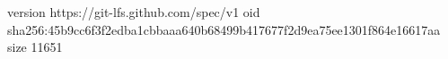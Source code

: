 version https://git-lfs.github.com/spec/v1
oid sha256:45b9cc6f3f2edba1cbbaaa640b68499b417677f2d9ea75ee1301f864e16617aa
size 11651
